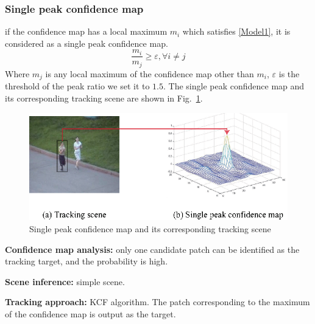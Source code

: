 \documentclass[conference]{IEEEtran}
\begin{document}
\subsubsection{Single peak confidence map}
if the confidence map has a local maximum $m_i$ which satisfies \eqref{Model1}, it is considered as a single peak confidence map.
\begin{equation}
	\frac{m_i}{m_j}\geqslant \varepsilon, \forall i\neq j
	\label{Model1}
\end{equation}
Where $m_j$ is any local maximum of the confidence map other than $m_i$, $\varepsilon$ is the threshold of the peak ratio we set it to $1.5$.
The single peak confidence map and its corresponding tracking scene are shown in Fig.~\ref{fig:1}.
\begin{figure}[htbp]
	\centering
	\includegraphics[scale=1]{con1.eps}
	\caption{Single peak confidence map and its corresponding tracking scene}
	\label{fig:1}
\end{figure}

\noindent
{\bfseries Confidence map analysis:} only one candidate patch can be identified as the tracking target, and the probability is high.

\noindent
{\bfseries Scene inference:} simple scene.

\noindent
{\bfseries Tracking approach:} KCF algorithm. The patch corresponding to the maximum of the confidence map is output as the target.
\end{document}
